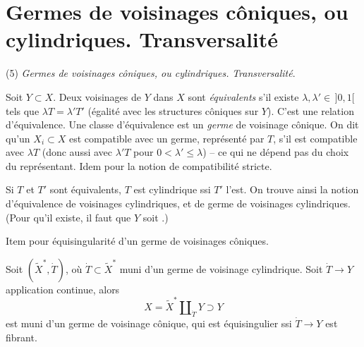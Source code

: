 \documentclass[11pt,a4paper]{article}
\begin{document}
\section*{Germes de voisinages côniques, ou cylindriques. Transversalité}


(5) \emph{Germes de voisinages côniques, ou cylindriques.}  \emph{Transversalité}.

Soit $Y\subset X$. Deux voisinages \struck{\ill{}}   de $Y$ dans $X$ sont \emph{équivalents} s'il existe $\lambda,\lambda'\in\,]0,1[$ tels que $\lambda T=\lambda' T'$ (égalité  avec les structures côniques sur $Y$). C'est une relation d'équivalence. Une classe d'équivalence est un \emph{germe} de voisinage cônique. On dit qu'un $X_i\subset X$ est compatible avec un germe, représenté par $T$, s'il est \add{$\exists\lambda\in\,]0,1[$ tel qu'il soit} compatible avec $\lambda T$ (donc aussi avec $\lambda' T$ pour $0<\lambda'\le\lambda$) -- ce qui ne dépend pas du choix du représentant. Idem pour la notion de compatibilité stricte.

\marginal{$\varepsilon\in\,]0,1[$, donc par $\lambda T=\varepsilon\lambda' T'$}

Si $T$ et $T'$ sont équivalents,  $T$ est cylindrique ssi $T'$ l'est. On trouve ainsi la notion d'équivalence de voisinages cylindriques, et  de germe de voisinages cylindriques. (Pour qu'il  existe, il faut que $Y$ soit .)


Item pour équisingularité d'un germe de voisinages côniques.

Soit $(\tilde X^{*},\dot T)$, où $\dot T\subset\tilde X^{*}$ muni d'un germe de voisinage cylindrique. Soit $\dot T\to Y$ application continue, alors \struck{\ill{}}
\[
X=\tilde X^{*}\amalg_{\dot T}Y\supset Y
\]
est muni d'un germe de voisinage  cônique, qui est équisingulier ssi $\dot T\to Y$ est fibrant.
\end{document}
